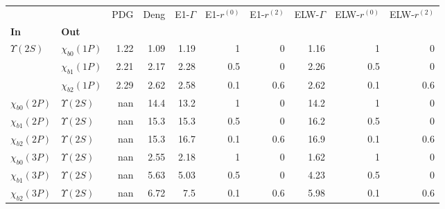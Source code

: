 \begin{tabular}{l|l|r|r|r|r|r|r|r|r}
\toprule
                &                &  PDG &  Deng &  E1-$\Gamma$ &  E1-$r^{(0)}$ &  E1-$r^{(2)}$ &  ELW-$\Gamma$ &  ELW-$r^{(0)}$ &  ELW-$r^{(2)}$ \\
\textbf{In} & \textbf{Out} &      &       &              &               &               &               &                &                \\
\midrule
\textbf{$\Upsilon(2S)$} & \textbf{$\chi_{b0}(1P)$} & 1.22 &  1.09 &         1.19 &             1 &             0 &          1.16 &              1 &              0 \\
                & \textbf{$\chi_{b1}(1P)$} & 2.21 &  2.17 &         2.28 &           0.5 &             0 &          2.26 &            0.5 &              0 \\
                & \textbf{$\chi_{b2}(1P)$} & 2.29 &  2.62 &         2.58 &           0.1 &           0.6 &          2.62 &            0.1 &            0.6 \\
\textbf{$\chi_{b0}(2P)$} & \textbf{$\Upsilon(2S)$} &  nan &  14.4 &         13.2 &             1 &             0 &          14.2 &              1 &              0 \\
\textbf{$\chi_{b1}(2P)$} & \textbf{$\Upsilon(2S)$} &  nan &  15.3 &         15.3 &           0.5 &             0 &          16.2 &            0.5 &              0 \\
\textbf{$\chi_{b2}(2P)$} & \textbf{$\Upsilon(2S)$} &  nan &  15.3 &         16.7 &           0.1 &           0.6 &          16.9 &            0.1 &            0.6 \\
\textbf{$\chi_{b0}(3P)$} & \textbf{$\Upsilon(2S)$} &  nan &  2.55 &         2.18 &             1 &             0 &          1.62 &              1 &              0 \\
\textbf{$\chi_{b1}(3P)$} & \textbf{$\Upsilon(2S)$} &  nan &  5.63 &         5.03 &           0.5 &             0 &          4.23 &            0.5 &              0 \\
\textbf{$\chi_{b2}(3P)$} & \textbf{$\Upsilon(2S)$} &  nan &  6.72 &          7.5 &           0.1 &           0.6 &          5.98 &            0.1 &            0.6 \\
\bottomrule
\end{tabular}
